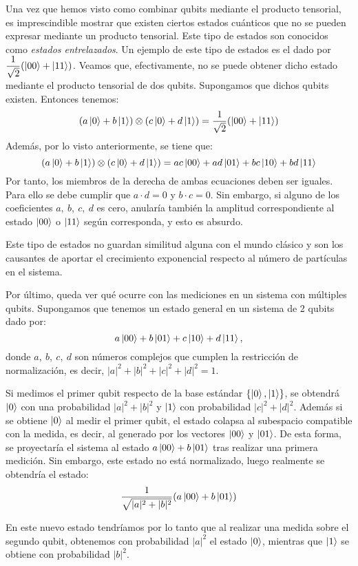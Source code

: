 Una vez que hemos visto como combinar qubits mediante el producto tensorial, es imprescindible mostrar que existen ciertos estados cuánticos que no se pueden expresar mediante un producto tensorial. Este tipo de estados son conocidos como \textit{estados entrelazados}. Un ejemplo de este tipo de estados es el dado por $\dfrac{1}{\sqrt{2}}(\left|00\right\rangle + \left|11\right\rangle)$. Veamos que, efectivamente, no se puede obtener dicho estado mediante el producto tensorial de dos qubits.
%
Supongamos que dichos qubits existen. Entonces tenemos:
$$
(a\left|0\right\rangle + b\left|1\right\rangle)\otimes (c\left|0\right\rangle + d\left|1\right\rangle) = \dfrac{1}{\sqrt{2}}(\left|00\right\rangle + \left|11\right\rangle)
$$
Además, por lo visto anteriormente, se tiene que:
$$
(a\left|0\right\rangle + b\left|1\right\rangle)\otimes (c\left|0\right\rangle + d\left|1\right\rangle) = ac\left|00\right\rangle + ad\left|01\right\rangle + bc\left|10\right\rangle + bd\left|11\right\rangle
$$
Por tanto, los miembros de la derecha de ambas ecuaciones deben ser iguales. Para ello se debe cumplir que $ a\cdot d = 0$ y $b\cdot c=0$. Sin embargo, si alguno de los coeficientes $a,\ b,\ c,\ d$ es cero, anularía  también la amplitud correspondiente al estado $\left|00\right\rangle$ o $\left|11\right\rangle$ según corresponda, y esto es absurdo.

Este tipo de estados no guardan similitud alguna con el mundo clásico y son los causantes de aportar el crecimiento exponencial respecto al número de partículas en el sistema.

Por último, queda ver qué ocurre con las mediciones en un sistema con múltiples qubits. Supongamos que tenemos un estado general en un sistema de 2 qubits dado por:
$$
a\left|00\right\rangle + b\left|01\right\rangle + c\left|10\right\rangle + d\left|11\right\rangle, 
$$
%
donde $a,\ b,\ c,\ d$ son números complejos que cumplen la restricción de normalización, es decir, $|a|^2 + |b|^2 + |c|^2 + |d|^2 = 1$.

Si medimos el primer qubit respecto de la base estándar $\{\left|0\right\rangle,\left|1\right\rangle\}$, se obtendrá $\left|0\right\rangle$ con una probabilidad $|a|^2 + |b|^2$ y $\left|1\right\rangle$ con probabilidad $|c|^2 + |d|^2$. Además si se obtiene $\left|0\right\rangle$ al medir el primer qubit, el estado colapsa al subespacio compatible con la medida, es decir, al generado por los vectores $\left|00\right\rangle$ y $\left|01\right\rangle$. De esta forma, se proyectaría el sistema al estado  $a\left|00\right\rangle + b\left|01\right\rangle$ tras realizar una primera medición. Sin embargo, este estado no está normalizado, luego realmente se obtendría el estado: 
$$
\dfrac{1}{\sqrt{|a|^2 + |b|^2}}(a\left|00\right\rangle + b\left|01\right\rangle)
$$

En este nuevo estado tendríamos por lo tanto que al realizar una medida sobre el segundo qubit, obtenemos con probabilidad $|a|^2$ el estado $\left|0\right\rangle$, mientras que  $\left|1\right\rangle$ se obtiene con probabilidad $|b|^2$.

